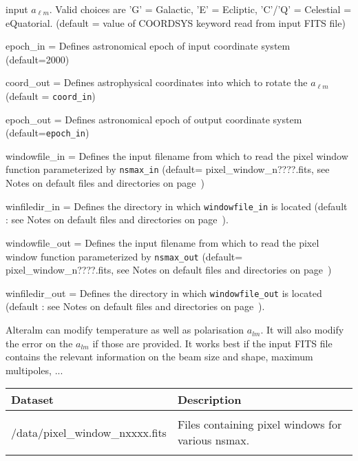 \begin{qualifiers}
\begin{qulist}{}
    input $a_{\ell m}$. Valid choices are 'G' = Galactic, 'E' = Ecliptic, 
    'C'/'Q' = Celestial = eQuatorial. (default = value of COORDSYS keyword read
    from input FITS file)
    \item[{epoch\_in = }] Defines astronomical epoch of input coordinate system (default=2000)
    \item[{coord\_out = }] Defines astrophysical coordinates into which to rotate
    the $a_{\ell m}$ (default = {\tt coord\_in})
    \item[{epoch\_out = }] Defines astronomical epoch of output coordinate system
    (default={\tt epoch\_in})
     \item[{windowfile\_in = }] Defines the input filename from which to read the pixel window function parameterized by {\tt nsmax\_in}
(default= pixel\_window\_n????.fits, see Notes on default files and directories on page~\pageref{page:defdir})
     \item[{winfiledir\_in = }] Defines the directory in which {\tt windowfile\_in}
    is located (default : see Notes on default files and directories on page~\pageref{page:defdir}).
     \item[{windowfile\_out = }] Defines the input filename from which to read the pixel window function parameterized by {\tt nsmax\_out}
(default= pixel\_window\_n????.fits, see Notes on default files and directories on page~\pageref{page:defdir})
     \item[{winfiledir\_out = }] Defines the directory in which {\tt windowfile\_out}
    is located (default : see Notes on default files and directories on page~\pageref{page:defdir}).

  \end{qulist}
\end{qualifiers}

\begin{codedescription}
{%
Alteralm can modify temperature as well as polarisation $a_{lm}$. It will also
modify the error on the $a_{lm}$ if those are provided. It works best if the
input FITS file contains the relevant information on the beam size and shape,
maximum multipoles, ...
}
\end{codedescription}

\begin{datasets}
{
\begin{tabular}{p{0.3\hsize} p{0.35\hsize}} \hline  
  \textbf{Dataset} & \textbf{Description} \\ \hline
                   &                      \\ %
  /data/pixel\_window\_nxxxx.fits & Files containing pixel windows for
                   various nsmax.\\ 
                   &                      \\ \hline %
\end{tabular}
} 
\end{datasets}

